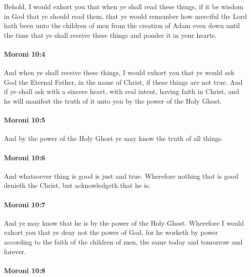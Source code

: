 			Behold, I would exhort you
			that when ye shall read these things,
			if it be wisdom in God that ye should read them,
			that ye would remember
			how merciful the Lord hath been unto the children of men
			from the creation of Adam even down until the time
			that ye shall receive these things
			and ponder it in your hearts.

		\paragraph{Moroni 10:4} %
			\label{MORONI-10-4}

			And when ye shall receive these things,
			I would exhort you
			that ye would ask God the Eternal Father,
			in the name of Christ,
			if these things are not true.
			And if ye shall ask with a sincere heart,
			with real intent, having faith in Christ,
			and he will manifest the truth of it unto you
			by the power of the Holy Ghost.

		\paragraph{Moroni 10:5} %
			\label{MORONI-10-5}

			And by the power of the Holy Ghost
			ye may know the truth of all things.

		\paragraph{Moroni 10:6} %
			\label{MORONI-10-6}

			And whatsoever thing is good is just and true.
			Wherefore nothing that is good denieth the Christ,
			but acknowledgeth that he is.

		\paragraph{Moroni 10:7} %
			\label{MORONI-10-7}

			And ye may know that he is
			by the power of the Holy Ghost.
			Wherefore I would exhort you that ye deny not the power of God,
			for he worketh by power according to the faith of the children of men,
			the same today and tomorrow and forever.

		\paragraph{Moroni 10:8} %
			\label{MORONI-10-8}

